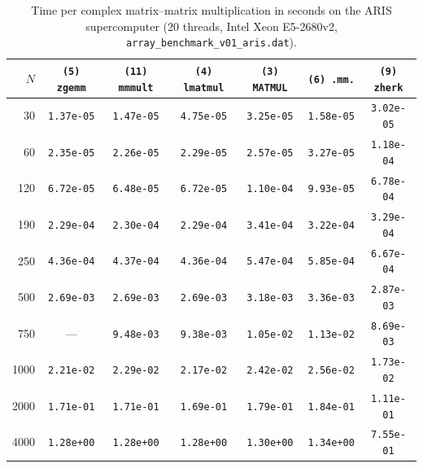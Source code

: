 \begin{table}[htbp]
\centering
\begin{tabular}{r c c c c c c}
\toprule
$N$ & \texttt{(5) zgemm} & \texttt{(11) mmmult} & \texttt{(4) lmatmul} & \texttt{(3) MATMUL} & \texttt{(6) .mm.} & \texttt{(9) zherk} \\
\midrule
30   & \texttt{1.37e-05} & \texttt{1.47e-05} & \texttt{4.75e-05} & \texttt{3.25e-05} & \texttt{1.58e-05} & \texttt{3.02e-05} \\
60   & \texttt{2.35e-05} & \texttt{2.26e-05} & \texttt{2.29e-05} & \texttt{2.57e-05} & \texttt{3.27e-05} & \texttt{1.18e-04} \\
120  & \texttt{6.72e-05} & \texttt{6.48e-05} & \texttt{6.72e-05} & \texttt{1.10e-04} & \texttt{9.93e-05} & \texttt{6.78e-04} \\
190  & \texttt{2.29e-04} & \texttt{2.30e-04} & \texttt{2.29e-04} & \texttt{3.41e-04} & \texttt{3.22e-04} & \texttt{3.29e-04} \\
250  & \texttt{4.36e-04} & \texttt{4.37e-04} & \texttt{4.36e-04} & \texttt{5.47e-04} & \texttt{5.85e-04} & \texttt{6.67e-04} \\
500  & \texttt{2.69e-03} & \texttt{2.69e-03} & \texttt{2.69e-03} & \texttt{3.18e-03} & \texttt{3.36e-03} & \texttt{2.87e-03} \\
750  & ---               & \texttt{9.48e-03} & \texttt{9.38e-03} & \texttt{1.05e-02} & \texttt{1.13e-02} & \texttt{8.69e-03} \\
1000 & \texttt{2.21e-02} & \texttt{2.29e-02} & \texttt{2.17e-02} & \texttt{2.42e-02} & \texttt{2.56e-02} & \texttt{1.73e-02} \\
2000 & \texttt{1.71e-01} & \texttt{1.71e-01} & \texttt{1.69e-01} & \texttt{1.79e-01} & \texttt{1.84e-01} & \texttt{1.11e-01} \\
4000 & \texttt{1.28e+00} & \texttt{1.28e+00} & \texttt{1.28e+00} & \texttt{1.30e+00} & \texttt{1.34e+00} & \texttt{7.55e-01} \\
\bottomrule
\end{tabular}
\caption{\label{tab:b3}Time per complex matrix--matrix multiplication in seconds on the ARIS supercomputer (20 threads, Intel Xeon E5-2680v2, \texttt{array\_benchmark\_v01\_aris.dat}).}
\end{table}

